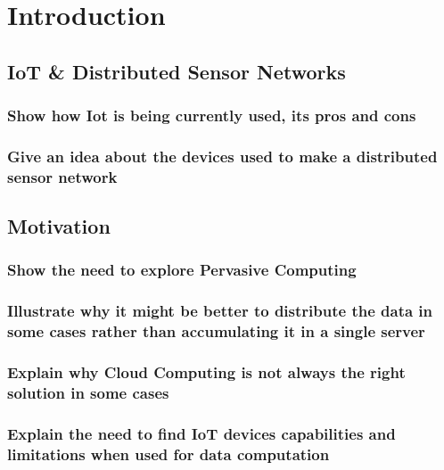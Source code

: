 
\chapter{Introduction}\label{chapter:introduction}
\section{IoT \& Distributed Sensor Networks}
\subsection{Show how Iot is being currently used, its pros and cons}
\subsection{Give an idea about the devices used to make a distributed sensor network}
\section{Motivation}
\subsection{Show the need to explore Pervasive Computing}

\subsection{Illustrate why it might be better to distribute the data in some cases rather than accumulating it in a single server}

\subsection{Explain why Cloud Computing is not always the right solution in some cases}

\subsection{Explain the need to find IoT devices capabilities and limitations when used for data computation}


